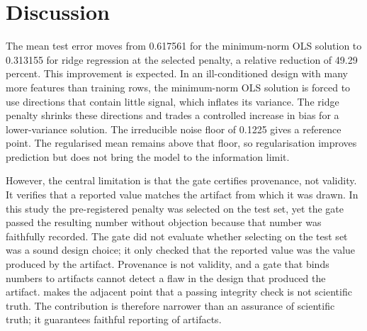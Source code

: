 \section{Discussion}

The mean test error moves from 0.617561 for the minimum-norm OLS solution to 0.313155 for ridge regression at the selected penalty, a relative reduction of 49.29 percent. This improvement is expected. In an ill-conditioned design with many more features than training rows, the minimum-norm OLS solution is forced to use directions that contain little signal, which inflates its variance. The ridge penalty shrinks these directions and trades a controlled increase in bias for a lower-variance solution. The irreducible noise floor of 0.1225 gives a reference point. The regularised mean remains above that floor, so regularisation improves prediction but does not bring the model to the information limit.

However, the central limitation is that the gate certifies provenance, not validity. It verifies that a reported value matches the artifact from which it was drawn. In this study the pre-registered penalty was selected on the test set, yet the gate passed the resulting number without objection because that number was faithfully recorded. The gate did not evaluate whether selecting on the test set was a sound design choice; it only checked that the reported value was the value produced by the artifact. Provenance is not validity, and a gate that binds numbers to artifacts cannot detect a flaw in the design that produced the artifact. \citet{luo2026xscientist} makes the adjacent point that a passing integrity check is not scientific truth. The contribution is therefore narrower than an assurance of scientific truth; it guarantees faithful reporting of artifacts.
